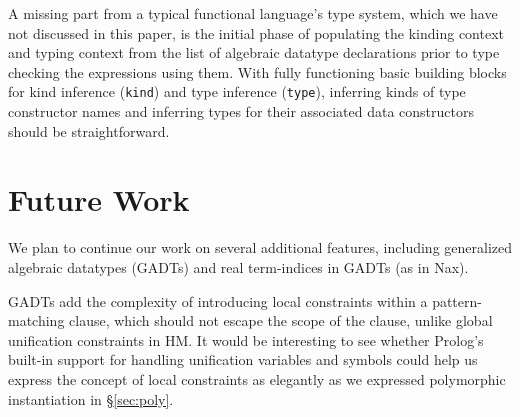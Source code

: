 \documentclass[runningheads,a4paper]{llncs}
\begin{document}
A missing part from a typical functional language's type system, which
we have not discussed in this paper, is the initial phase of populating
the kinding context and typing context from the list of algebraic datatype
declarations prior to type checking the expressions using them.
With fully functioning basic building blocks for kind inference
(\verb|kind|) and type inference (\verb|type|), inferring kinds of
type constructor names and inferring types for their associated
data constructors should be straightforward.


\section{Future Work}\label{sec:futwork}
We plan to continue our work on several additional features, including
generalized algebraic datatypes (GADTs) and real term-indices
in GADTs (as in Nax).

GADTs add the complexity of introducing local constraints
within a pattern-matching clause, which should not escape
the scope of the clause, unlike global unification constraints in HM.
It would be interesting to see whether Prolog's built-in support for
handling unification variables and symbols could help us express
the concept of local constraints as elegantly as we expressed
polymorphic instantiation in \S\ref{sec:poly}.
\end{document}
